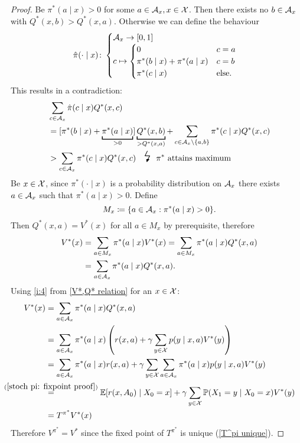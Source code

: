\begin{proof}
	\xToy{\ref{ii:3}}{\ref{ii:4}} 
	Be \(\pi^*(a\mid x)>0\) for some \(a\in\mathcal{A}_x,x\in\mathcal{X}\). Then there exists no \(b\in\mathcal{A}_x\) with \(Q^*(x,b)>Q^*(x,a)\). Otherwise we can define the behaviour
	\[
		\hat{\pi}(\cdot\mid x)\colon
		\begin{cases}
			\mathcal{A}_x\to[0,1]\\
			c\mapsto 
			\begin{cases}
				0 & c=a \\
				\pi^*(b\mid x) + \pi^*(a\mid x) & c=b\\
				\pi^*(c\mid x) & \text{else}.
			\end{cases}
		\end{cases}
	\]
	This results in a contradiction:
	\begin{align*}
		&\sum_{c\in\cA_x} \hat{\pi}(c\mid x) Q^*(x,c)\\
		&=[\pi^*(b\mid x) %
		+ \underbracket[1pt]{\pi^*(a\mid x)}_{>0}] \underbracket[1pt]{Q^*(x,b)}_{>Q^*(x,a)}
		+\sum_{c\in\cA_x\setminus \{a,b\}} \pi^*(c\mid x)Q^*(x,c)\\
		&> \sum_{c\in\cA_x} \pi^*(c\mid x) Q^*(x,c) \contradiction{\pi^* \text{ attains maximum}}
	\end{align*}
	\xToy{\ref{ii:4}}{\ref{ii:2}} Be \(x\in\mathcal{X}\), since \(\pi^*(\cdot\mid x)\) is a probability distribution on \(\mathcal{A}_x\) there exists \(a\in\mathcal{A}_x\) such that \(\pi^*(a\mid x)>0\). Define
	\[
		M_x\coloneqq \{a\in\mathcal{A}_x:\pi^*(a\mid x)>0 \}.
	\]
	Then \(Q^*(x,a)=V^*(x)\) for all \(a\in M_x\) by prerequisite, therefore
	\begin{align*}
		V^*(x)&= \sum_{a\in M_x} \pi^*(a\mid x) V^*(x) 
		= \sum_{a\in M_x} \pi^*(a\mid x)Q^*(x,a)\\
		&=\sum_{a\in \mathcal{A}_x} \pi^*(a\mid x)Q^*(x,a).
	\end{align*}
	\xToy{\ref{ii:2}}{\ref{ii:1}} Using \ref{i:4} from \ref{V*,Q* relation} for an \(x\in\mathcal{X}\):
	\begin{align*}
		V^*(x)&=\sum_{a\in \cA_x} \pi^*(a\mid x)Q^*(x,a)\\
		&=\sum_{a\in \cA_x} \pi^*(a\mid x) 
		\left(r(x,a)+\gamma \sum\limits_{y\in\cX}p(y\mid x,a) V^*(y)\right)\\
		&=\sum_{a\in \cA_x}\pi^*(a\mid x)r(x,a)
		+\gamma \sum_{y\in\cX} \sum_{a\in\cA_x}\pi^*(a\mid x)p(y\mid x,a)V^*(y)\\
		&\lxeq{(\ref{stoch pi: fixpoint proof})}\E[r(x,A_0)\mid X_0=x] 
		+ \gamma \sum_{y\in\cX}\Pr(X_1=y\mid X_0 =x) V^*(y)\\
		&=T^{\pi^*} V^*(x)
	\end{align*}
	Therefore \(V^{\pi^*} = V^*\) since the fixed point of \(T^{\pi^*}\) is unique (\ref{T^pi unique}).
\end{proof}
